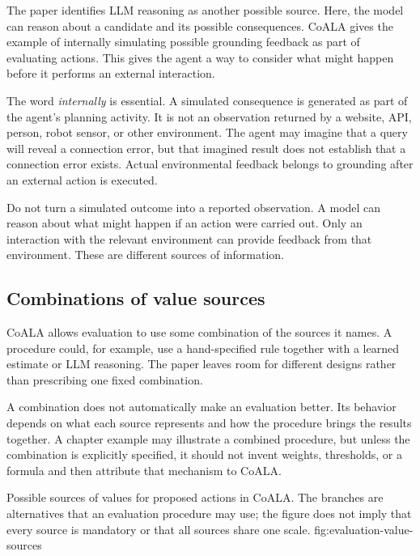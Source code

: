 The paper identifies LLM reasoning as another possible source. Here, the model can reason about a candidate and its possible consequences. CoALA gives the example of internally simulating possible grounding feedback as part of evaluating actions. This gives the agent a way to consider what might happen before it performs an external interaction.

The word \emph{internally} is essential. A simulated consequence is generated as part of the agent's planning activity. It is not an observation returned by a website, API, person, robot sensor, or other environment. The agent may imagine that a query will reveal a connection error, but that imagined result does not establish that a connection error exists. Actual environmental feedback belongs to grounding after an external action is executed.

\begin{warningbox}
Do not turn a simulated outcome into a reported observation. A model can reason about what might happen if an action were carried out. Only an interaction with the relevant environment can provide feedback from that environment. These are different sources of information.
\end{warningbox}

\subsection{Combinations of value sources}

CoALA allows evaluation to use some combination of the sources it names. A procedure could, for example, use a hand-specified rule together with a learned estimate or LLM reasoning. The paper leaves room for different designs rather than prescribing one fixed combination.

A combination does not automatically make an evaluation better. Its behavior depends on what each source represents and how the procedure brings the results together. A chapter example may illustrate a combined procedure, but unless the combination is explicitly specified, it should not invent weights, thresholds, or a formula and then attribute that mechanism to CoALA.

  {Possible sources of values for proposed actions in CoALA. The branches are alternatives that an evaluation procedure may use; the figure does not imply that every source is mandatory or that all sources share one scale.}
  {fig:evaluation-value-sources}

